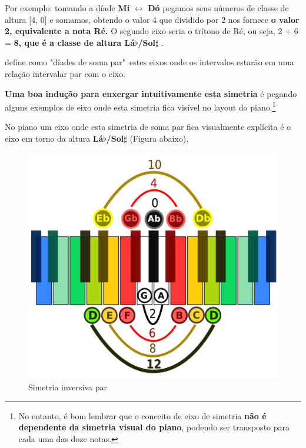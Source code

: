 \documentclass[
	12pt,				%
	openright,			%
	twoside,			%
	a4paper,			%
	english,			%
	french,				%
	spanish,			%
	brazil				%
	]{abntex2}
\begin{document}
Por exemplo: tomando a díade \textbf{Mi} $\leftrightarrow $ \textbf{Dó} pegamos seus números de classe de altura [4, 0] e somamos, obtendo o valor 4 que dividido por 2 nos fornece \textbf{o valor 2, equivalente a nota Ré.} O segundo eixo seria o trítono de Ré, ou seja, 2 + 6 =\textbf{ 8, que é a classe de altura Lá$\flat$/Sol$\sharp$ }. 


 define como "díades de soma par"\ estes eixos onde os intervalos estarão em uma relação intervalar par com o eixo.

\textbf{Uma boa indução para enxergar intuitivamente esta simetria} é pegando alguns exemplos de eixo onde esta simetria fica visível no layout do piano.\footnote{No entanto, é bom lembrar que o conceito de eixo de simetria \textbf{não é dependente  da simetria visual do piano}, podendo ser transposto para cada uma das doze notas.}

No piano um eixo onde esta simetria de soma par fica visualmente explícita é o eixo em torno da altura \textbf{Lá$\flat$/Sol$\sharp$} (Figura abaixo).

\begin{figure}[!h]
	\caption{\label{fig_grafico}Simetria inversiva par}
	\begin{center}
	    \includegraphics[scale=0.3]{axis/simetriainversiva_par.pdf}
	\end{center}
\end{figure}
\end{document}
